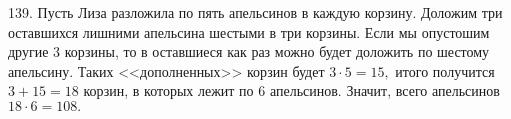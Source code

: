 139.  Пусть Лиза разложила по пять апельсинов в каждую корзину. Доложим три оставшихся лишними апельсина шестыми в три корзины. Если мы опустошим другие 3 корзины, то в оставшиеся как раз можно будет доложить по шестому апельсину. Таких <<дополненных>> корзин будет $3\cdot5=15,$ итого получится $3+15=18$ корзин, в которых лежит по 6 апельсинов. Значит, всего апельсинов $18\cdot6=108.$\\
